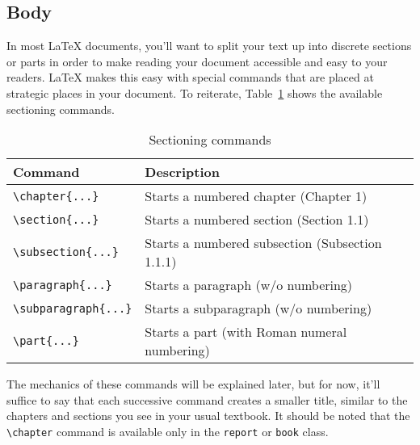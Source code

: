 \subsection{Body}
\label{sec:body}

In most \LaTeX{} documents, you'll want to split your text up into
discrete sections or parts in order to make reading your document
accessible and easy to your readers.  \LaTeX{} makes this easy with
special commands that are placed at strategic places in your document.
To reiterate, Table~\ref{tab:sectioning-cmd} shows the available
sectioning commands.
\begin{table}[htbp]
  \centering
  \caption{Sectioning commands}
  \label{tab:sectioning-cmd}
  \begin{tabular}{@{}ll@{}}
    \toprule
    Command & Description \\
    \midrule
    \verb=\chapter{...}= & Starts a numbered chapter (Chapter 1) \\
    \verb=\section{...}= & Starts a numbered section (Section 1.1) \\
    \verb=\subsection{...}= & Starts a numbered subsection (Subsection
    1.1.1) \\
    \verb=\paragraph{...}= & Starts a paragraph (w/o numbering) \\
    \verb=\subparagraph{...}= & Starts a subparagraph (w/o numbering)
    \\
    \verb=\part{...}= & Starts a part (with Roman numeral
    numbering) \\
    \bottomrule
  \end{tabular}      
\end{table}

The mechanics of these commands will be explained later, but for now,
it'll suffice to say that each successive command creates a smaller
title, similar to the chapters and sections you see in your usual
textbook.  It should be noted that the \verb=\chapter= command is
available only in the \texttt{report} or \texttt{book} class.

